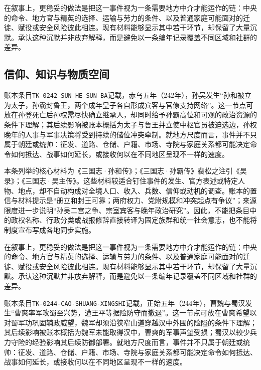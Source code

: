 在叙事上，更稳妥的做法是把这一事件视为一条需要地方中介才能运作的链：中央的命令、地方官与精英的选择、运输与劳力的条件、以及普通家庭可能面对的迁徙、赋役或安全风险彼此相连。现有材料能够显示其中若干环节，却保留了大量沉默。承认这种沉默并非放弃解释，而是避免以一条编年记录覆盖不同区域和社群的差异。

\subsection{信仰、知识与物质空间}

账本条目\texttt{TK-0242-SUN-HE-SUN-BA}记载，赤乌五年（242年），孙吴发生“孙和被立为太子，孙霸封鲁王，两个成年皇子各自形成宾客与官僚支持网络”。这一节点可放在孙登死亡后孙权需尽快确立继承人，却同时给予孙霸高位和可观的政治资源的条件下理解；其后续影响被账本概括为太子与鲁王并立使中枢官员被迫选边，孙权晚年的人事与军事决策将受到持续的储位冲突牵制。就地方尺度而言，事件并不只属于朝廷或统帅：征发、道路、仓储、户籍、市场、寺院与家庭关系都可能决定命令如何抵达、战事如何延长，或接收何以在不同地区呈现不一样的速度。

本条列举的核心材料为《三国志·孙和传》；《三国志·孙霸传》裴松之注引《吴录》；《三国志·吴主传》。这些材料较适合钉住事件的发生、官方表述或特定人物、地点，却不自动构成对全境人口、收入、兵数、信仰或动机的调查。账本的置信与材料提示是“册立和封王可靠；两府权力、党附规模和冲突起点有争议”；来源限度进一步说明“孙吴二宫之争、宗室宾客与晚年政治研究”。因此，不能把条目中的政权名称、行政分类或战报修辞直接转译为固定族群和统一社会意志，也不能将制度宣布写成各地同步实施。

在叙事上，更稳妥的做法是把这一事件视为一条需要地方中介才能运作的链：中央的命令、地方官与精英的选择、运输与劳力的条件、以及普通家庭可能面对的迁徙、赋役或安全风险彼此相连。现有材料能够显示其中若干环节，却保留了大量沉默。承认这种沉默并非放弃解释，而是避免以一条编年记录覆盖不同区域和社群的差异。

账本条目\texttt{TK-0244-CAO-SHUANG-XINGSHI}记载，正始五年（244年），曹魏与蜀汉发生“曹爽率军攻蜀至兴势，遭王平等据险防守而撤退”。这一节点可放在曹爽希望以对蜀军功巩固辅政威望，魏军却须沿狭窄山道穿越汉中外围的险隘的条件下理解；其后续影响被账本概括为魏军未能取得汉中，曹爽的军事声望受损；蜀汉以较少兵力守险的经验影响其后续防御部署。就地方尺度而言，事件并不只属于朝廷或统帅：征发、道路、仓储、户籍、市场、寺院与家庭关系都可能决定命令如何抵达、战事如何延长，或接收何以在不同地区呈现不一样的速度。

